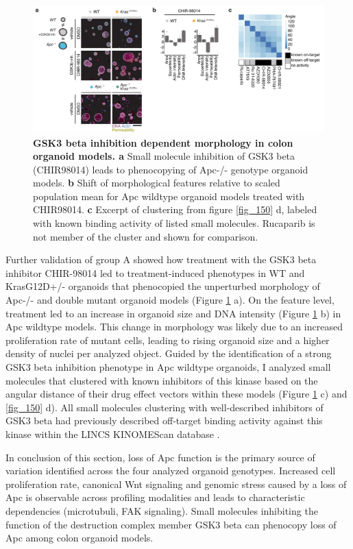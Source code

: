 \begin{flushleft}
\begin{figure}[h]
\centering
\includegraphics[scale=0.75,
                keepaspectratio]{figures/adenomaprofiling/pdf/fig_2_4.pdf}
\caption{\textbf{GSK3 beta inhibition dependent morphology in colon organoid models. a} Small molecule inhibition of GSK3 beta (CHIR98014) leads to phenocopying of Apc-/- genotype organoid models. \textbf{b} Shift of morphological features relative to scaled population mean for Apc wildtype organoid models treated with CHIR98014. \textbf{c} Excerpt of clustering from figure \ref{fig_150} d, labeled with known binding activity of listed small molecules. Rucaparib is not member of the cluster and shown for comparison.}
\label{fig_185}
\end{figure}
\bigbreak

Further validation of group A showed how treatment with the GSK3 beta inhibitor CHIR-98014 led to treatment-induced phenotypes in WT and KrasG12D+/- organoids that phenocopied the unperturbed morphology of Apc-/- and double mutant organoid models (Figure \ref{fig_185} a). On the feature level, treatment led to an increase in organoid size and DNA intensity (Figure \ref{fig_185} b) in Apc wildtype models. This change in morphology was likely due to an increased proliferation rate of mutant cells, leading to rising organoid size and a higher density of nuclei per analyzed object. Guided by the identification of a strong GSK3 beta inhibition phenotype in Apc wildtype organoids, I analyzed small molecules that clustered with known inhibitors of this kinase based on the angular distance of their drug effect vectors within these models (Figure \ref{fig_185} c) and \ref{fig_150} d). All small molecules clustering with well-described inhibitors of GSK3 beta had previously described off-target binding activity against this kinase within the LINCS KINOMEScan database \cite{Duan2014-ku}.  

\smallbreak
In conclusion of this section, loss of Apc function is the primary source of variation identified across the four analyzed organoid genotypes. Increased cell proliferation rate, canonical Wnt signaling and genomic stress caused by a loss of Apc is observable across profiling modalities and leads to characteristic dependencies (microtubuli, FAK signaling). Small molecules inhibiting the function of the destruction complex member GSK3 beta can phenocopy loss of Apc among colon organoid models.   


\end{flushleft}

